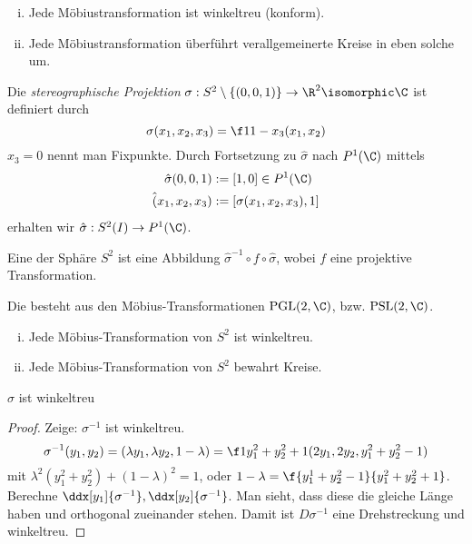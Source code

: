 \begin{st}
	\begin{enumerate}[(i)]
		\item
			Jede Möbiustransformation ist winkeltreu (konform).
		\item
			Jede Möbiustransformation überführt verallgemeinerte Kreise in eben solche um.
	\end{enumerate}
\end{st}

\begin{df}
	Die \emph{stereographische Projektion} $\sigma: S^2 \setminus \{ (0, 0, 1) \} \to \R^2 \isomorphic \C$ ist definiert durch
	\[
		\sigma(x_1, x_2, x_3) = \f 1{1-x_3} (x_1, x_2)
	\]
	$x_3 = 0$ nennt man Fixpunkte.
	Durch Fortsetzung zu $\hat \sigma$ nach $P^1(\C)$ mittels
	\begin{align*}
		\hat \sigma(0,0,1) &:= [1, 0] \in P^1(\C) \\
		\hat (x_1, x_2, x_3) &:= [\sigma(x_1, x_2, x_3), 1]
	\end{align*}
	erhalten wir $\hat \sigma: S^2(I) \to P^1(\C)$.
\end{df}

\begin{df}
	Eine  der Sphäre $S^2$ ist eine Abbildung $\hat \sigma^{-1} \circ f \circ \hat \sigma$, wobei $f$ eine projektive Transformation.

	Die  besteht aus den Möbius-Transformationen $\PGL(2, \C)$, bzw. $\PSL(2, \C)$.
\end{df}

\begin{st}
	\begin{enumerate}[(i)]
		\item
			Jede Möbius-Transformation von $S^2$ ist winkeltreu.
		\item
			Jede Möbius-Transformation von $S^2$ bewahrt Kreise.
	\end{enumerate}
\end{st}

\begin{lem}
	$\sigma$ ist winkeltreu
	\begin{proof}
		Zeige: $\sigma^{-1}$ ist winkeltreu.
		\[
			\sigma^{-1}(y_1, y_2)
			= (\lambda y_1, \lambda y_2, 1 - \lambda)
			= \f 1{y_1^2 + y_2^2 + 1} (2y_1, 2y_2, y_1^2 + y_2^2 - 1)
		\]
		mit $\lambda^2 (y_1^2 + y_2^2) + (1-\lambda)^2 = 1$, oder $1 - \lambda = \f{y_1^1 + y_2^2 - 1}{y_1^2 + y_2^2 + 1}$.
		Berechne $\ddx[y_1]{\sigma^{-1}}, \ddx[y_2]{\sigma^{-1}}$.
		Man sieht, dass diese die gleiche Länge haben und orthogonal zueinander stehen.
		Damit ist $D \sigma^{-1}$ eine Drehstreckung und winkeltreu.
	\end{proof}
\end{lem}

